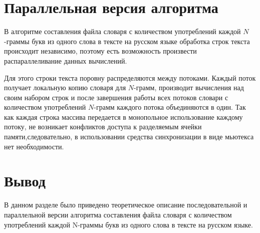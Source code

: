 \section{Параллельная версия алгоритма}

В алгоритме составления файла словаря с количеством употреблений каждой $N$-граммы букв из одного слова в тексте на русском языке обработка строк текста происходит независимо, поэтому есть возможность произвести распараллеливание данных вычислений. 

Для этого строки текста поровну распределяются между потоками. Каждый поток получает локальную копию словаря для $N$-грамм, производит вычисления над своим набором строк и после завершения работы всех потоков словари с количеством употреблений $N$-грамм каждого потока объединяются в один. 
Так как каждая строка массива передается в монопольное использование каждому потоку, не возникает конфликтов доступа к разделяемым ячейки памяти,следовательно, в использовании средства синхронизации в виде мьютекса нет необходимости.

\section*{Вывод}

В данном разделе было приведено теоретическое описание последовательной и параллельной версии алгоритма составления файла словаря с количеством употреблений каждой N-граммы букв из одного слова в тексте на русском языке.
